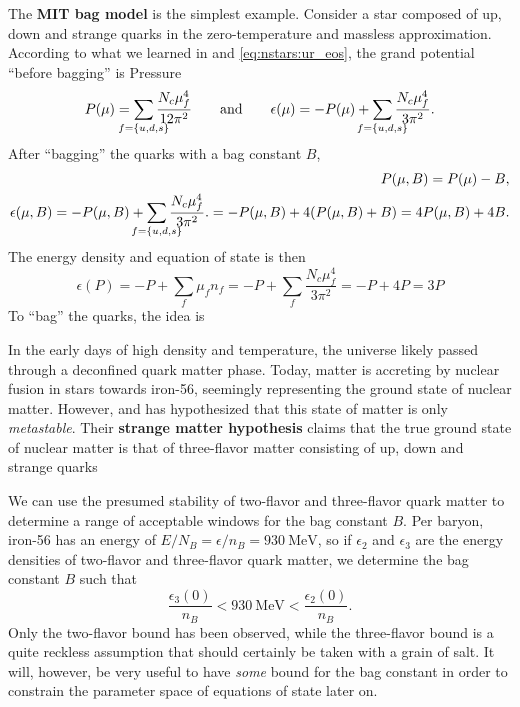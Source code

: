 The \textbf{MIT bag model} is the simplest example.
Consider a star composed of up, down and strange quarks in the zero-temperature and massless approximation.
According to what we learned in  and \eqref{eq:nstars:ur_eos}, the grand potential ``before bagging'' is
Pressure
\begin{equation}
	P(\mu) = \smashoperator{\sum_{f=\{u,d,s\}}} \frac{N_c \mu_f^4}{12 \pi^2}
	\qquad \text{and} \qquad
	\epsilon(\mu) = -P(\mu) + \smashoperator{\sum_{f=\{u,d,s\}}} \frac{N_c \mu_f^4}{3 \pi^2}.
\end{equation}
After ``bagging'' the quarks with a bag constant $B$,
\begin{equation}
\begin{split}
	P(\mu,B) = P(\mu) - B, \\
	\epsilon(\mu,B) = -P(\mu,B) + \smashoperator{\sum_{f=\{u,d,s\}}} \frac{N_c \mu_f^4}{3 \pi^2}.
	                = -P(\mu,B) + 4 (P(\mu,B) + B) = 4 P(\mu,B) + 4 B.
\end{split}
\end{equation}
The energy density and equation of state is then
\begin{equation}
	\epsilon(P) = -P + \sum_f \mu_f n_f = -P + \sum_f \frac{N_c \mu_f^4}{3 \pi^2} = -P + 4P = 3P
\end{equation}
To ``bag'' the quarks, the idea is 

In the early days of high density and temperature, the universe likely passed through a deconfined quark matter phase.
Today, matter is accreting by nuclear fusion in stars towards iron-56, seemingly representing the ground state of nuclear matter.
However, \cite{ref:strange_hypothesis_bodmer} and \cite{ref:strange_hypothesis_witten} has hypothesized that this state of matter is only \emph{metastable}.
Their \textbf{strange matter hypothesis} claims that the true ground state of nuclear matter is that of three-flavor matter consisting of up, down and strange quarks

We can use the presumed stability of two-flavor and three-flavor quark matter to determine a range of acceptable windows for the bag constant $B$.
Per baryon, iron-56 has an energy of $E/N_B = \epsilon/n_B = \SI{930}{\mega\electronvolt}$,
so if $\epsilon_2$ and $\epsilon_3$ are the energy densities of two-flavor and three-flavor quark matter,
we determine the bag constant $B$ such that
\begin{equation}
	\frac{\epsilon_3(0)}{n_B} < \SI{930}{\mega\electronvolt} < \frac{\epsilon_2(0)}{n_B} .
\label{eq:lsm:bag_stability}
\end{equation}
Only the two-flavor bound has been observed,
while the three-flavor bound is a quite reckless assumption that should certainly be taken with a grain of salt.
It will, however, be very useful to have \emph{some} bound for the bag constant in order to constrain the parameter space of equations of state later on.

